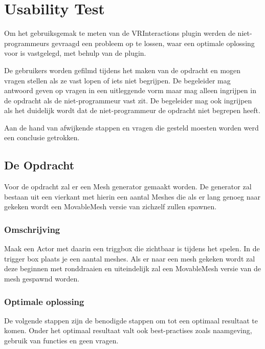 
\chapter{Usability Test}
\label{appendix:usertest1}
\lhead{}

Om het gebruiksgemak te meten van de VRInteractions plugin werden de niet-programmeurs gevraagd een probleem op te lossen, waar een optimale oplossing voor is vastgelegd, met behulp van de plugin. 

De gebruikers worden gefilmd tijdens het maken van de opdracht en mogen vragen stellen als ze vast lopen of iets niet begrijpen. De begeleider mag antwoord geven op vragen in een uitleggende vorm maar mag alleen ingrijpen in de opdracht als de niet-programmeur vast zit. De begeleider mag ook ingrijpen als het duidelijk wordt dat de niet-programmeur de opdracht niet begrepen heeft.

Aan de hand van afwijkende stappen en vragen die gesteld moesten worden werd een conclusie getrokken.

\section{De Opdracht}
Voor de opdracht zal er een Mesh generator gemaakt worden. De generator zal bestaan uit een vierkant met hierin een aantal Meshes die als er lang genoeg naar gekeken wordt een MovableMesh versie van zichzelf zullen spawnen.

\subsection{Omschrijving}
Maak een Actor met daarin een triggbox die zichtbaar is tijdens het spelen. In de trigger box plaats je een aantal meshes. Als er naar een mesh gekeken wordt zal deze beginnen met ronddraaien en uiteindelijk zal een MovableMesh versie van de mesh gespawnd worden. 

\subsection{Optimale oplossing}
De volgende stappen zijn de benodigde stappen om tot een optimaal resultaat te komen. Onder het optimaal resultaat valt ook best-practises zoals naamgeving, gebruik van functies en geen vragen.

